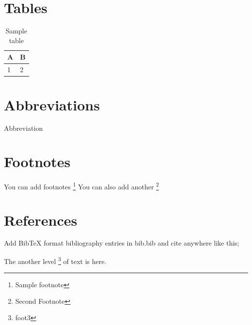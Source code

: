 \section{Tables}
\begin{table}
	\centering
	\begin{tabular}{l|l}
		A & B \\
		\hline 
		1 & 2 
	\end{tabular}
	\caption{Sample table}
	\label{tab:highlights}
\end{table}

\section{Abbreviations}
Abbreviation

\section{Footnotes}
You can add footnotes \footnote{Sample footnote}
You can also add another \footnote{Second Footnote}

\section{References}
Add BibTeX format bibliography entries in bib.bib and cite anywhere like this; \cite{knuth1984texbook}


The another level \footnote{foot3} of text is here.



